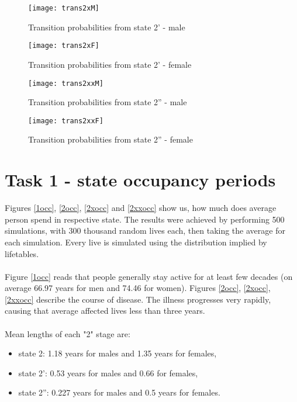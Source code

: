 \documentclass[11pt,wide]{mwart}
\begin{document}
\begin{figure}[!htbp]
	\caption{Transition probabilities from state 2' - male}
	\label{trans2xM}
	\texttt{[image: trans2xM]}
	\centering
\end{figure}

\begin{figure}[!htbp]
	\caption{Transition probabilities from state 2' - female}
	\label{trans2xF}
	\texttt{[image: trans2xF]}
	\centering
\end{figure}

\begin{figure}[!htbp]
	\caption{Transition probabilities from state 2'' - male}
	\label{trans2xxM}
	\texttt{[image: trans2xxM]}
	\centering
\end{figure}

\begin{figure}[!htbp]
	\caption{Transition probabilities from state 2'' - female}
	\label{trans2xxF}
	\texttt{[image: trans2xxF]}
	\centering
\end{figure}



\newpage

\section{Task 1 - state occupancy periods}

Figures \ref{1occ}, \ref{2occ}, \ref{2xocc} and \ref{2xxocc} show us, how much does average person spend in respective state. The results were achieved by performing 500 simulations, with 300 thousand random lives each, then taking the average for each simulation. Every live is simulated using the distribution implied by lifetables.\\\\
Figure \ref{1occ} reads that people generally stay active for at least few decades (on average 66.97 years for men and 74.46 for women). 
Figures \ref{2occ}, \ref{2xocc}, \ref{2xxocc} describe the course of disease. The illness progresses very rapidly, causing that average affected lives less than three years.\\\\
Mean lengths of each "2" stage are:
\begin{itemize}
	\item state 2: 1.18 years for males and 1.35 years for females,
	\item state 2': 0.53 years for males and 0.66 for females,
	\item state 2'': 0.227 years for males and 0.5 years for females.
\end{itemize}
\end{document}
